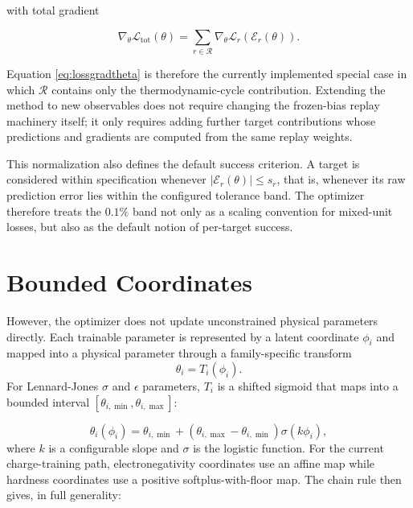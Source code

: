 with total gradient

\begin{equation}
    \nabla_\theta \mathcal{L}_{\mathrm{tot}}(\theta)
    =
    \sum_{r \in \mathcal{R}}
    \nabla_\theta \mathcal{L}_r(\mathcal{E}_r(\theta)).
    \label{eq:totallossgrad}
\end{equation}

Equation \eqref{eq:lossgradtheta} is therefore the currently implemented special case in which $\mathcal{R}$ contains only the thermodynamic-cycle contribution. Extending the method to new observables does not require changing the frozen-bias replay machinery itself; it only requires adding further target contributions whose predictions and gradients are computed from the same replay weights.

This normalization also defines the default success criterion. A target is considered within specification whenever $|\mathcal{E}_r(\theta)| \le s_r$, that is, whenever its raw prediction error lies within the configured tolerance band. The optimizer therefore treats the $0.1\%$ band not only as a scaling convention for mixed-unit losses, but also as the default notion of per-target success.

\section{Bounded Coordinates}

However, the optimizer does not update unconstrained physical parameters directly. Each trainable parameter is represented by a latent coordinate $\phi_i$ and mapped into a physical parameter through a family-specific transform
\[
    \theta_i = T_i(\phi_i).
\]
For Lennard-Jones $\sigma$ and $\epsilon$ parameters, $T_i$ is a shifted sigmoid that maps into a bounded interval $[\theta_{i,\min}, \theta_{i,\max}]$:

\begin{equation}
    \theta_i(\phi_i)
    =
    \theta_{i,\min}
    +
    \left(
        \theta_{i,\max} - \theta_{i,\min}
    \right)
    \sigma(k \phi_i),
    \label{eq:phitheta}
\end{equation}
%
where $k$ is a configurable slope and $\sigma$ is the logistic function. For the current charge-training path, electronegativity coordinates use an affine map while hardness coordinates use a positive softplus-with-floor map. The chain rule then gives, in full generality:

